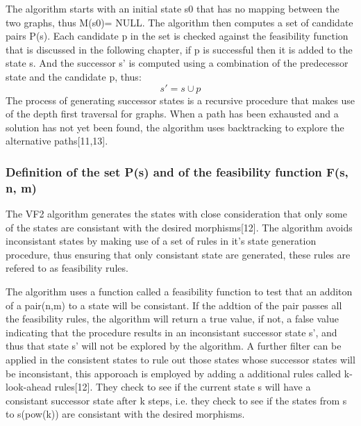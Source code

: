 The algorithm starts with an initial state s0 that has no mapping between the two graphs, thus M(s0)= NULL. The algorithm then computes a set of candidate pairs P(s). Each candidate p in the set is checked against the feasibility function that is discussed in the following chapter, if p is successful then it is added to the state s. And
the successor s' is computed using a combination of the predecessor state and the candidate p, thus:
	\begin{equation}
		s' = s \cup p
	\end{equation} 
The process of generating successor states is a recursive procedure that makes use of the depth first traversal for graphs. When a path has been 
exhausted and a solution has not yet been found, the algorithm uses backtracking to explore the alternative paths[11,13].

\subsubsection{Definition of the set P(s) and of the feasibility function F(s, n, m)}
The VF2 algorithm generates the states with close consideration that only some of the states are consistant with the desired morphisms[12]. The algorithm avoids inconsistant states by making use of a set of rules in it's state generation procedure, thus ensuring that only consistant state are generated, these rules are refered to as feasibility rules.\newline\newline

 The algorithm uses a function called a feasibility function to test that an additon of a pair(n,m) to a state will be consistant. If the addtion of the pair passes all the feasibility rules, the algorithm will return a true value, if not, a false value indicating that the procedure results in an inconsistant successor  state s', and thus that state s' will not be explored by the algorithm.\newline\newline
 A further filter can be applied in the consistent states to rule out those states whose successor states will be inconsistant, this apporoach is employed by adding a additional rules called k-look-ahead rules[12]. They check to see if the current state s will have a consistant successor state after k steps, i.e. they check to see if the states from s to s(pow(k)) are consistant with the desired morphisms.

